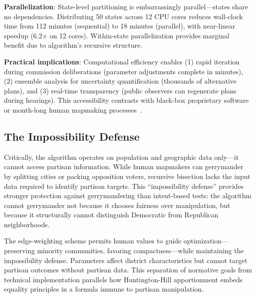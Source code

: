 \textbf{Parallelization}: State-level partitioning is embarrassingly parallel---states share no dependencies. Distributing 50 states across 12 CPU cores reduces wall-clock time from 112 minutes (sequential) to 18 minutes (parallel), with near-linear speedup (6.2× on 12 cores). Within-state parallelization provides marginal benefit due to algorithm's recursive structure.

\textbf{Practical implications}: Computational efficiency enables (1) rapid iteration during commission deliberations (parameter adjustments complete in minutes), (2) ensemble analysis for uncertainty quantification (thousands of alternative plans), and (3) real-time transparency (public observers can regenerate plans during hearings). This accessibility contrasts with black-box proprietary software or month-long human mapmaking processes~\cite{deluca2026recursive}.

\subsection{The Impossibility Defense}

Critically, the algorithm operates on population and geographic data only---it cannot access partisan information. While human mapmakers can gerrymander by splitting cities or packing opposition voters, recursive bisection lacks the input data required to identify partisan targets. This ``impossibility defense'' provides stronger protection against gerrymandering than intent-based tests: the algorithm cannot gerrymander not because it chooses fairness over manipulation, but because it structurally cannot distinguish Democratic from Republican neighborhoods.

The edge-weighting scheme permits human values to guide optimization---preserving minority communities, favoring compactness---while maintaining the impossibility defense. Parameters affect district characteristics but cannot target partisan outcomes without partisan data. This separation of normative goals from technical implementation parallels how Huntington-Hill apportionment embeds equality principles in a formula immune to partisan manipulation.
